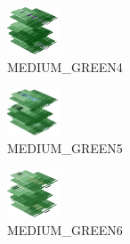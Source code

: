 \hspace{0.1cm}
\begin{minipage}[b]{0.15\linewidth}
\begin{figure}[H]                                                          
  \centering                                                             
  \begin{adjustbox}{width=1.5cm,center}                                   
  \includegraphics[width=1.5cm]{src/colorspace_colourflow/flows/colourflow_196-45.png}%
  \end{adjustbox}                                                        
\caption*{MEDIUM\_GREEN4}                                           
\end{figure}                                                               
\end{minipage}
\hspace{0.1cm}
\begin{minipage}[b]{0.15\linewidth}
\begin{figure}[H]                                                          
  \centering                                                             
  \begin{adjustbox}{width=1.5cm,center}                                   
  \includegraphics[width=1.5cm]{src/colorspace_colourflow/flows/colourflow_197-45.png}%
  \end{adjustbox}                                                        
\caption*{MEDIUM\_GREEN5}                                           
\end{figure}                                                               
\end{minipage}
\hspace{0.1cm}
\begin{minipage}[b]{0.15\linewidth}
\begin{figure}[H]                                                          
  \centering                                                             
  \begin{adjustbox}{width=1.5cm,center}                                   
  \includegraphics[width=1.5cm]{src/colorspace_colourflow/flows/colourflow_198-45.png}%
  \end{adjustbox}                                                        
\caption*{MEDIUM\_GREEN6}                                           
\end{figure}                                                               
\end{minipage}
